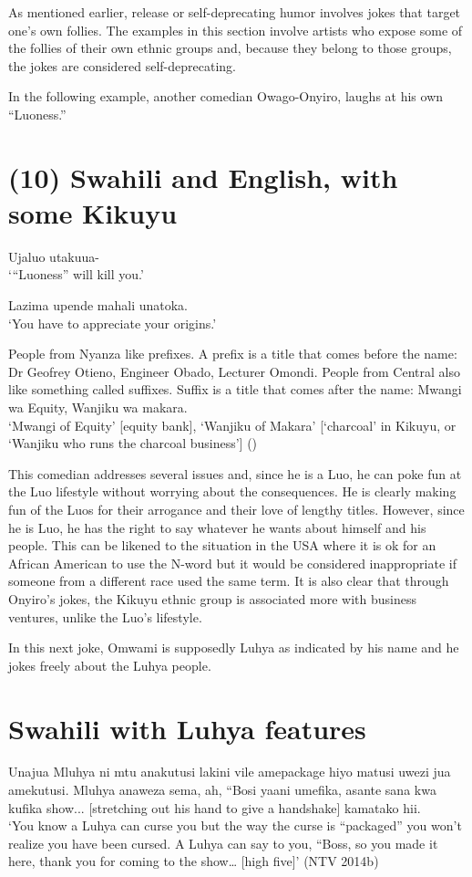 \documentclass[output=paper]{langsci/langscibook}
\begin{document}
   As mentioned earlier, release or self-deprecating humor involves jokes that target one’s own follies. The examples in this section involve artists who expose some of the follies of their own ethnic groups and, because they belong to those groups, the jokes are considered self-deprecating. 

In the following example, another comedian Owago-Onyiro, laughs at his own “Luoness.”

\chapter{(10) Swahili and English, with some Kikuyu}
\gll   Ujaluo utakuua-\\
\glt ‘“Luoness” will kill you.’
\z

\gll Lazima upende mahali unatoka.\\
\glt ‘You have to appreciate your origins.’ 
\z

\gll People from Nyanza like prefixes. A prefix is a title that comes before the name: Dr Geofrey Otieno, Engineer Obado, Lecturer Omondi. People from Central also like something called suffixes. Suffix is a title that comes after the name: Mwangi wa Equity, Wanjiku wa makara.\\
\glt ‘Mwangi of Equity’ [equity bank], ‘Wanjiku of Makara’ [‘charcoal’ in Kikuyu, or ‘Wanjiku who runs the charcoal business’] ()
\z

This comedian addresses several issues and, since he is a Luo, he can poke fun at the Luo lifestyle without worrying about the consequences. He is clearly making fun of the Luos for their arrogance and their love of lengthy titles. However, since he is Luo, he has the right to say whatever he wants about himself and his people. This can be likened to the situation in the USA where it is ok for an African American to use the N-word but it would be considered inappropriate if someone from a different race used the same term. It is also clear that through Onyiro’s jokes, the Kikuyu ethnic group is associated more with business ventures, unlike the Luo’s lifestyle. 

In this next joke, Omwami is supposedly Luhya as indicated by his name and he jokes freely about the Luhya people.

\chapter{Swahili with Luhya features}
\gll Unajua Mluhya ni mtu anakutusi lakini vile amepackage hiyo matusi uwezi jua amekutusi. Mluhya anaweza sema, ah, “Bosi yaani umefika, asante sana kwa kufika show... \textup{[stretching out his hand to give a handshake] }kamatako hii.\\
‘You know a Luhya can curse you but the way the curse is “packaged” you won’t realize you have been cursed. A Luhya can say to you, “Boss, so you made it here, thank you for coming to the show… [high five]’ (NTV 2014b)
\end{document}
